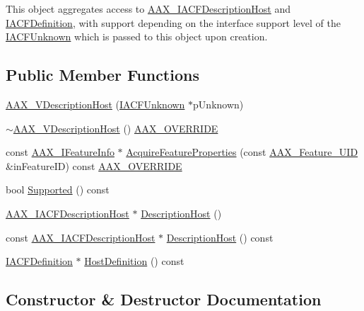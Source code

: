This object aggregates access to \mbox{\hyperlink{a01649}{A\+A\+X\+\_\+\+I\+A\+C\+F\+Description\+Host}} and \mbox{\hyperlink{a01413}{I\+A\+C\+F\+Definition}}, with support depending on the interface support level of the \mbox{\hyperlink{a01409}{I\+A\+C\+F\+Unknown}} which is passed to this object upon creation. \subsection*{Public Member Functions}
\begin{DoxyCompactItemize}
\item 
\mbox{\hyperlink{a01909_a07eba69ed3cbafb4f9cd5c04030903c1}{A\+A\+X\+\_\+\+V\+Description\+Host}} (\mbox{\hyperlink{a01409}{I\+A\+C\+F\+Unknown}} $\ast$p\+Unknown)
\item 
\mbox{\hyperlink{a01909_a324ef2cc3258247f19ce8b758b196f8a}{$\sim$\+A\+A\+X\+\_\+\+V\+Description\+Host}} () \mbox{\hyperlink{a00392_ac2f24a5172689ae684344abdcce55463}{A\+A\+X\+\_\+\+O\+V\+E\+R\+R\+I\+DE}}
\item 
const \mbox{\hyperlink{a01829}{A\+A\+X\+\_\+\+I\+Feature\+Info}} $\ast$ \mbox{\hyperlink{a01909_a60edaf5e2fff55315bc0c3ecb9a86118}{Acquire\+Feature\+Properties}} (const \mbox{\hyperlink{a00392_a53d6cf8a08224b3e813333e411ce798e}{A\+A\+X\+\_\+\+Feature\+\_\+\+U\+ID}} \&in\+Feature\+ID) const \mbox{\hyperlink{a00392_ac2f24a5172689ae684344abdcce55463}{A\+A\+X\+\_\+\+O\+V\+E\+R\+R\+I\+DE}}
\item 
bool \mbox{\hyperlink{a01909_a0aed23abb81a049ca3450a867d3cc2b3}{Supported}} () const
\item 
\mbox{\hyperlink{a01649}{A\+A\+X\+\_\+\+I\+A\+C\+F\+Description\+Host}} $\ast$ \mbox{\hyperlink{a01909_a92f91b44add592e217499c1674ee76df}{Description\+Host}} ()
\item 
const \mbox{\hyperlink{a01649}{A\+A\+X\+\_\+\+I\+A\+C\+F\+Description\+Host}} $\ast$ \mbox{\hyperlink{a01909_a3f5c1365ff89ed800ff980c0c5eaac3a}{Description\+Host}} () const
\item 
\mbox{\hyperlink{a01413}{I\+A\+C\+F\+Definition}} $\ast$ \mbox{\hyperlink{a01909_ad1fe1d38840a467304d2adce856bd21e}{Host\+Definition}} () const
\end{DoxyCompactItemize}


\subsection{Constructor \& Destructor Documentation}
\mbox{\label{a01909_a07eba69ed3cbafb4f9cd5c04030903c1}} 
